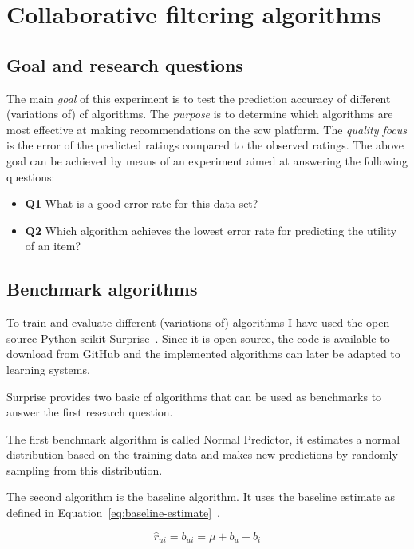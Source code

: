 \section{Collaborative filtering algorithms}
\label{sec:eval-cf}

\subsection{Goal and research questions}
The main \textit{goal} of this experiment is to test the prediction accuracy of different (variations of) \gls{cf} algorithms.
The \textit{purpose} is to determine which algorithms are most effective at making recommendations on the \gls{scw} platform.
The \textit{quality focus} is the error of the predicted ratings compared to the observed ratings.
The above goal can be achieved by means of an experiment aimed at answering the following questions:
\begin{itemize}
    \item \textbf{Q1} What is a good error rate for this data set?
    \item \textbf{Q2} Which algorithm achieves the lowest error rate for predicting the utility of an item?
\end{itemize}

\subsection{Benchmark algorithms}
To train and evaluate different (variations of) algorithms I have used the open source Python scikit Surprise~\cite{Hug2020}.
Since it is open source, the code is available to download from GitHub and the implemented algorithms can later be adapted to learning systems.

Surprise provides two basic \gls{cf} algorithms that can be used as benchmarks to answer the first research question.

The first benchmark algorithm is called Normal Predictor, it estimates a normal distribution based on the training data and makes new predictions by randomly sampling from this distribution.

The second algorithm is the baseline algorithm.
It uses the baseline estimate as defined in Equation~\ref{eq:baseline-estimate}~\cite{Koren2010}.

\begin{equation}
    \label{eq:baseline-estimate}
    \hat{r}_{ui} = b_{ui} = \mu + b_u + b_i
\end{equation}

